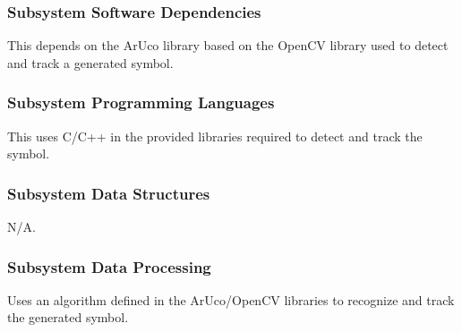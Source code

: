 \subsubsection{Subsystem Software Dependencies}
This depends on the ArUco library based on the OpenCV library used to detect and track a generated symbol.

\subsubsection{Subsystem Programming Languages}
This uses C/C++ in the provided libraries required to detect and track the symbol.

\subsubsection{Subsystem Data Structures}
N/A.

\subsubsection{Subsystem Data Processing}
Uses an algorithm defined in the ArUco/OpenCV libraries to recognize and track the generated symbol.